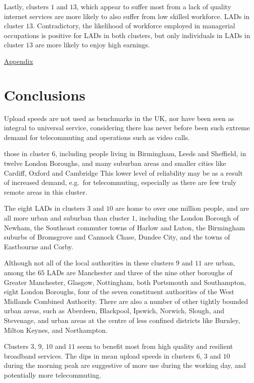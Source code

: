 \documentclass[,]{sagej}
\begin{document}
Lastly, clusters \(1\) and \(13\), which appear to suffer most from a
lack of quality internet services are more likely to also suffer from
low skilled workforce. LADs in cluster \(13\). Contradictory, the
likelihood of workforce employed in managerial occupations is positive
for LADs in both clusters, but only individuals in LADs in cluster
\(13\) are more likely to enjoy high earnings.

\protect\hyperlink{sec:appendix}{Appendix}

\hypertarget{sec:5}{%
\section{Conclusions}\label{sec:5}}

Upload speeds are not used as benchmarks in the UK, nor have been seen
as integral to universal service, considering there has never before
been such extreme demand for telecommuting and operations such as video
calls.

those in cluster \(6\), including people living in Birmingham, Leeds and
Sheffield, in twelve London Boroughs, and many suburban areas and
smaller cities like Cardiff, Oxford and Cambridge This lower level of
reliability may be as a result of increased demand, e.g.~for
telecommuting, especially as there are few truly remote areas in this
cluster.

The eight LADs in clusters \(3\) and \(10\) are home to over one million
people, and are all more urban and suburban than cluster \(1\),
including the London Borough of Newham, the Southeast commuter towns of
Harlow and Luton, the Birmingham suburbs of Bromsgrove and Cannock
Chase, Dundee City, and the towns of Eastbourne and Corby.

Although not all of the local authorities in these clusters \(9\) and
\(11\) are urban, among the \(65\) LADs are Manchester and three of the
nine other boroughs of Greater Manchester, Glasgow, Nottingham, both
Portsmouth and Southampton, eight London Boroughs, four of the seven
constituent authorities of the West Midlands Combined Authority. There
are also a number of other tightly bounded urban areas, such as
Aberdeen, Blackpool, Ipswich, Norwich, Slough, and Stevenage, and urban
areas at the centre of less confined districts like Burnley, Milton
Keynes, and Northampton.

Clusters \(3\), \(9\), \(10\) and \(11\) seem to benefit most from high
quality and resilient broadband services. The dips in mean upload speeds
in clusters \(6\), \(3\) and \(10\) during the morning peak are
suggestive of more use during the working day, and potentially more
telecommuting.
\end{document}
